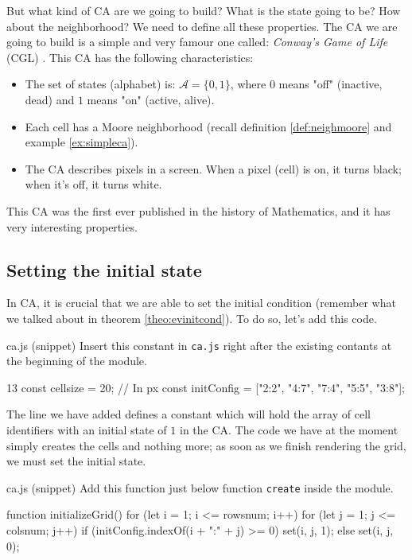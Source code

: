 But what kind of CA are we going to build? What is the state going to be? How about the neighborhood? We
need to define all these properties. The CA we are going to build is a simple and very famour one called:
\textit{Conway's Game of Life} (CGL) \cite{wolfram-ca}.
This CA has the following characteristics:

\begin{itemize}
\item The set of states (alphabet) is: $\mathcal{A} = \{ 0, 1 \}$, where $0$ means "off" (inactive, dead) and
$1$ means "on" (active, alive).
\item Each cell has a Moore neighborhood (recall definition \ref{def:neighmoore} and example \ref{ex:simpleca}).
\item The CA describes pixels in a screen. When a pixel (cell) is on, it turns black; when it's off, it
turns white. 
\end{itemize}

This CA was the first ever published in the history of Mathematics, and it has very interesting properties.

\subsection{Setting the initial state}
In CA, it is crucial that we are able to set the initial condition (remember what we talked about in
theorem \ref{theo:evinitcond}). To do so, let's add this code.

\begin{programcode}{ca.js (snippet)}
Insert this constant in \texttt{ca.js} right after the existing contants at the beginning of the module.
\begin{codeh1}{1}{3}
const cellsize = 20; // In px
const initConfig = ["2:2", "4:7", "7:4", "5:5", "3:8"];
\end{codeh1}
\end{programcode}

The line we have added defines a constant which will hold the array of cell identifiers with an initial state
of $1$ in the CA. The code we have at the moment simply creates the cells and nothing more;
as soon as we finish rendering the grid, we must set the initial state.

\begin{programcode}{ca.js (snippet)}
Add this function just below function \texttt{create} inside the module.
\begin{code}
function initializeGrid() {
  for (let i = 1; i <= rowsnum; i++) {
    for (let j = 1; j <= colsnum; j++) {
      if (initConfig.indexOf(i + ":" + j) >= 0) {
        set(i, j, 1);
      } else {
        set(i, j, 0);
      }
    }
  }
}
\end{code}
\end{programcode}

